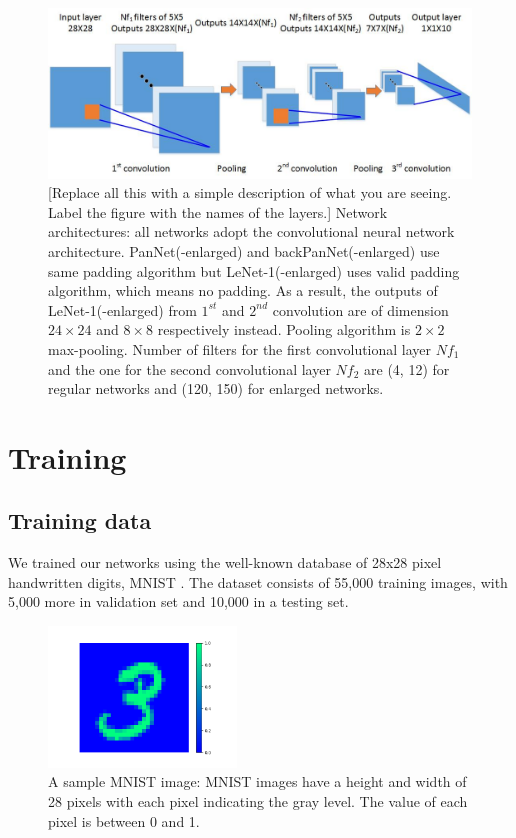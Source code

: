 \begin{figure}[th]
\centering
\includegraphics[width=140mm]{Figures/Network_Architecture}
\decoRule
\caption{[Replace all this with a simple description of what you are seeing. Label the figure with the names of the layers.]
Network architectures: all networks adopt the convolutional neural network architecture. PanNet(-enlarged) and backPanNet(-enlarged) use same padding algorithm but LeNet-1(-enlarged) uses valid padding algorithm, which means no padding. As a result, the outputs of LeNet-1(-enlarged) from \(1^{st}\) and \(2^{nd}\) convolution are of dimension \(24 \times 24\) and \(8 \times 8\) respectively instead. Pooling algorithm is \(2 \times 2\) max-pooling. Number of filters for the first convolutional layer \(Nf_{1}\) and the one for the second convolutional layer \(Nf_{2}\) are (4, 12) for regular networks and (120, 150) for enlarged networks. }
\label{fig:network architecture}
\end{figure}




\section{Training}

\subsection{Training data}

We trained our networks using the well-known database of 28x28 pixel handwritten digits, MNIST \cite{noauthor_mnist_nodate}. The dataset consists of 55,000 training images, with 5,000 more in validation set and 10,000 in a testing set.

\begin{figure}[th]
\centering
\includegraphics[width=50mm]{Figures/Input}
\decoRule
\caption{A sample MNIST image: MNIST images have a height and width of 28 pixels with each pixel indicating the gray level. The value of each pixel is between 0 and 1.}
\label{fig:input}
\end{figure}

